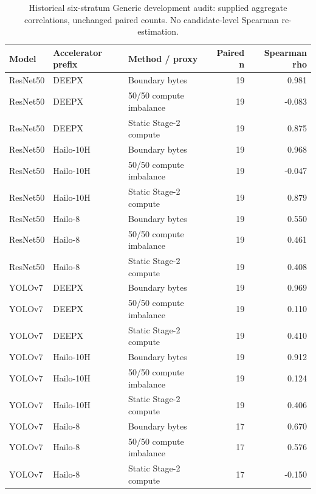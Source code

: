 \begin{longtable}{@{}llp{5.3cm}rr@{}}
\caption{Historical six-stratum Generic development audit: supplied aggregate correlations, unchanged paired counts. No candidate-level Spearman re-estimation.}\\
\toprule
Model & Accelerator prefix & Method / proxy & Paired n & Spearman rho \\
\midrule\endhead
ResNet50 & DEEPX & Boundary bytes & 19 & 0.981 \\
ResNet50 & DEEPX & 50/50 compute imbalance & 19 & -0.083 \\
ResNet50 & DEEPX & Static Stage-2 compute & 19 & 0.875 \\
ResNet50 & Hailo-10H & Boundary bytes & 19 & 0.968 \\
ResNet50 & Hailo-10H & 50/50 compute imbalance & 19 & -0.047 \\
ResNet50 & Hailo-10H & Static Stage-2 compute & 19 & 0.879 \\
ResNet50 & Hailo-8 & Boundary bytes & 19 & 0.550 \\
ResNet50 & Hailo-8 & 50/50 compute imbalance & 19 & 0.461 \\
ResNet50 & Hailo-8 & Static Stage-2 compute & 19 & 0.408 \\
YOLOv7 & DEEPX & Boundary bytes & 19 & 0.969 \\
YOLOv7 & DEEPX & 50/50 compute imbalance & 19 & 0.110 \\
YOLOv7 & DEEPX & Static Stage-2 compute & 19 & 0.410 \\
YOLOv7 & Hailo-10H & Boundary bytes & 19 & 0.912 \\
YOLOv7 & Hailo-10H & 50/50 compute imbalance & 19 & 0.124 \\
YOLOv7 & Hailo-10H & Static Stage-2 compute & 19 & 0.406 \\
YOLOv7 & Hailo-8 & Boundary bytes & 17 & 0.670 \\
YOLOv7 & Hailo-8 & 50/50 compute imbalance & 17 & 0.576 \\
YOLOv7 & Hailo-8 & Static Stage-2 compute & 17 & -0.150 \\
\bottomrule\end{longtable}
